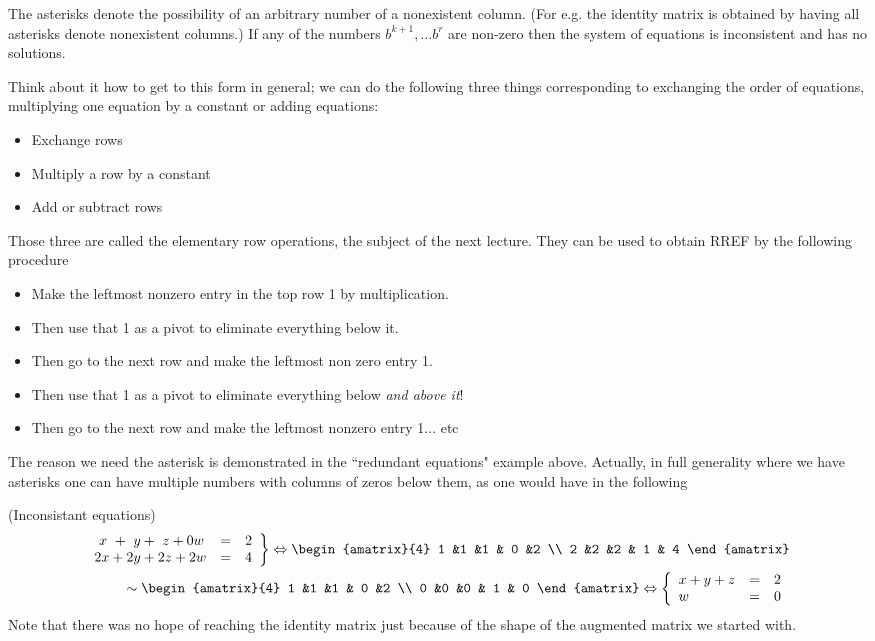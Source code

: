 \noindent
The asterisks denote the possibility of an arbitrary number of a nonexistent column. (For e.g. the identity matrix is obtained by having all asterisks denote nonexistent columns.) 
If any of the numbers $b^{k+1},\dots b^r$ are non-zero then the system of equations is inconsistent and has no solutions. 


Think about it how to get to this form in general; we can do the following three things corresponding to exchanging the order of equations, multiplying one equation by a constant or adding equations:
\begin{itemize}
\item Exchange rows
\item Multiply a row by a constant
\item Add or subtract rows
\end{itemize}
Those three are called the elementary row operations, the subject of the next lecture. 
They can be used to obtain  RREF by the following procedure
\begin{itemize}
\item Make the leftmost nonzero entry in the top row 1 by multiplication.  
\item Then use that 1 as a pivot to eliminate everything below it. 
\item Then go to the next row and make the leftmost non zero entry 1. 
\item Then use that 1 as a pivot to eliminate everything below {\it and above it}! 
\item Then go to the next row and make the leftmost nonzero entry 1... etc
\end{itemize}
The reason we need the asterisk is demonstrated in the ``redundant equations" example above. 
Actually, in full generality where we have asterisks one can have multiple numbers with columns of zeros below them, as one would have in the following

\begin{example} (Inconsistant equations)
 \begin{eqnarray*}
   \left.
\begin{array}{lcr}
	\ x \ + \ y + \ z +  0w & = & 2 \\
	2x + 2y +2z+2w & = &  4
     \end{array}
   \right\} 
   \Leftrightarrow
\begin{amatrix}{4}
1 &1 &1 & 0 &2 \\ 
2 &2 &2 & 1 & 4
\end{amatrix}
\\
\sim
\begin{amatrix}{4}
1 &1 &1 & 0 &2 \\ 
0 &0 &0 & 1 & 0
\end{amatrix}
\Leftrightarrow
\left\{
\begin{array}{lcr}
	x + y +z& = & 2 \\
	 w & = &  0
     \end{array}
   \right.
\end{eqnarray*}  
Note that there was no hope of reaching the identity matrix just because of the shape of the augmented matrix we started with. 
\end{example}


